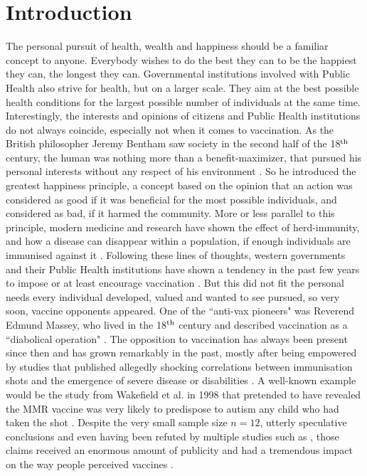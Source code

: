 \documentclass[12pt,a4paper,twoside]{article}
\begin{document}
\newpage

\listoffigures

\newpage

\section{Introduction}

The personal pursuit of health, wealth and happiness should be a familiar concept to anyone. Everybody wishes to do the best they can to be the happiest they can, the longest they can. Governmental institutions involved with Public Health also strive for health, but on a larger scale. They aim at the best possible health conditions for the largest possible number of individuals at the same time. Interestingly, the interests and opinions of citizens and Public Health institutions do not always coincide, especially not when it comes to vaccination. As the British philosopher Jeremy Bentham saw society in the second half of the 18$^{\textnormal{th}}$ century, the human was nothing more than a benefit-maximizer, that pursued his personal interests without any respect of his environment \cite{Bentham1988}. So he introduced the greatest happiness principle, a concept based on the opinion that an action was considered as good if it was beneficial for the most possible individuals, and considered as bad, if it harmed the community. More or less parallel to this principle, modern medicine and research have shown the effect of herd-immunity, and how a disease can disappear within a population, if enough individuals are immunised against it \cite{Gordis2014}. Following these lines of thoughts, western governments and their Public Health institutions have shown a tendency in the past few years to impose or at least encourage vaccination \cite{KBV2019, Drew2019}. But this did not fit the personal needs every individual developed, valued and wanted to see pursued, so very soon, vaccine opponents appeared. One of the ``anti-vax pioneers" was Reverend Edmund Massey, who lived in the 18$^{\textnormal{th}}$ century and described vaccination as a ``diabolical operation" \cite{MASSEY2018}. The opposition to vaccination has always been present since then and has grown remarkably in the past, mostly after being empowered by studies that published allegedly shocking correlations between immunisation shots and the emergence of severe disease or disabilities \cite{Rao2011}. A well-known example would be the study from Wakefield et al. in 1998 that pretended to have revealed the \ac{MMR} vaccine was very likely to predispose to autism any child who had taken the shot \cite{Wakefield1998}. Despite the very small sample size $n = 12$, utterly speculative conclusions and even having been refuted by multiple studies such as \cite{DeStefano2013, Dales2001, Taylor1999}, those claims received an enormous amount of publicity and had a tremendous impact on the way people perceived vaccines \cite{Rao2011}.\newline
\end{document}
